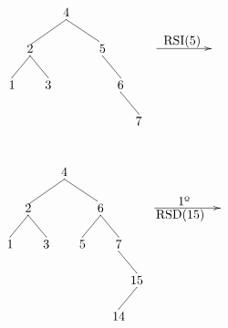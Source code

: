 \documentclass[10pt,a4paper,spanish]{report}
\begin{document}
\begin{minipage}{0.5\textwidth}
\[\begin{xy}
,(32,-8)*+=<20mm>[]\txt<2cm>{RSI(5)}
,(0,0)*+=<10mm>[]\txt<2cm>{4}
,(-10,-10)*+=<10mm>[]\txt<2cm>{2}
,(10,-10)*+=<10mm>[]\txt<2cm>{5}
,(-15,-20)*+=<10mm>[]\txt<2cm>{1}
,(-5,-20)*+=<10mm>[]\txt<2cm>{3}
,(15,-20)*+=<10mm>[]\txt<2cm>{6}
,(20,-30)*+=<10mm>[]\txt<2cm>{7}

\ar@{->} (25,-10);(40,-10)
\ar@{-} (0,-2);(-10,-9) %
\ar@{-} (0,-2);(9,-8) %
\ar@{-} (-10,-12);(-15,-18) %
\ar@{-} (10,-12);(15,-18) %
\ar@{-} (-10,-12);(-5,-18) %
\ar@{-} (15,-22);(20,-28)
\end{xy}\]
\end{minipage}
\begin{minipage}{0.5\textwidth}
\[\begin{xy}
,(33,-8)*+=<10mm>[]\txt<2cm>{1º}
,(32,-12)*+=<20mm>[]\txt<2cm>{RSD(15)}
,(0,0)*+=<10mm>[]\txt<2cm>{4}
,(-10,-10)*+=<10mm>[]\txt<2cm>{2}
,(10,-10)*+=<10mm>[]\txt<2cm>{6}
,(-15,-20)*+=<10mm>[]\txt<2cm>{1}
,(-5,-20)*+=<10mm>[]\txt<2cm>{3}
,(5,-20)*+=<10mm>[]\txt<2cm>{5}
,(15,-20)*+=<10mm>[]\txt<2cm>{7}
,(20,-30)*+=<10mm>[]\txt<2cm>{15}
,(15,-40)*+=<10mm>[]\txt<2cm>{14}

\ar@{->} (25,-10);(43,-10)
\ar@{-} (0,-2);(-10,-9) %
\ar@{-} (0,-2);(9,-8) %
\ar@{-} (-10,-12);(-15,-18) %
\ar@{-} (10,-12);(5,-18) %
\ar@{-} (10,-12);(15,-18) %
\ar@{-} (-10,-12);(-5,-18) %
\ar@{-} (15,-22);(20,-28)
\ar@{-} (20,-32);(15,-38)
\end{xy}\]
\end{minipage}
\end{document}
